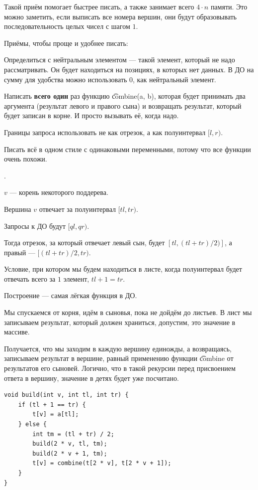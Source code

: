 Такой приём помогает быстрее писать, а также занимает всего $4 \cdot n$ памяти. Это можно заметить, если выписать все номера вершин, они будут образовывать последовательность целых чисел с шагом $1$.

Приёмы, чтобы проще и удобнее писать:

\up \up
\begin{MyList}[0pt]
	\item Определиться с нейтральным элементом --- такой элемент, который не надо рассматривать. Он будет находиться на позициях, в которых нет данных. В ДО на сумму для удобства можно использовать $0$, как нейтральный элемент.
	\item Написать {\bf всего один} раз функцию \t{combine(a, b)}, которая будет принимать два аргумента (результат левого и правого сына) и возвращать результат, который будет записан в корне. И просто вызывать её, когда надо.
	\item Границы запроса использовать не как отрезок, а как полуинтервал $[l, r)$.
	\item Писать всё в одном стиле с одинаковыми переменными, потому что все функции очень похожи.
\end{MyList} \up \up

.

$v$ --- корень некоторого поддерева.

Вершина $v$ отвечает за полуинтервал $[tl, tr)$.

Запросы к ДО будут $[ql, qr)$.

Тогда отрезок, за который отвечает левый сын, будет $[tl, (tl + tr) / 2)]$, а правый --- $[(tl + tr) / 2, tr)$.

Условие, при котором мы будем находиться в листе, когда полуинтервал будет отвечать всего за $1$ элемент, $tl + 1 = tr$.


\pagebreak


Построение --- самая лёгкая функция в ДО. 

Мы спускаемся от корня, идём в сыновья, пока не дойдём до листьев. В лист мы записываем результат, который должен храниться, допустим, это значение в массиве.

Получается, что мы заходим в каждую вершину единожды, а возвращаясь, записываем результат в вершине, равный применению функции \t{combine} от результатов его сыновей. Логично, что в такой рекурсии перед присвоением ответа в вершину, значение в детях будет уже посчитано.
\up \up
\begin{verbatim}
void build(int v, int tl, int tr) {
	if (tl + 1 == tr) {
		t[v] = a[tl];
	} else {
		int tm = (tl + tr) / 2;
		build(2 * v, tl, tm);
		build(2 * v + 1, tm);
		t[v] = combine(t[2 * v], t[2 * v + 1]);
	}
}
\end{verbatim}
\up \up

